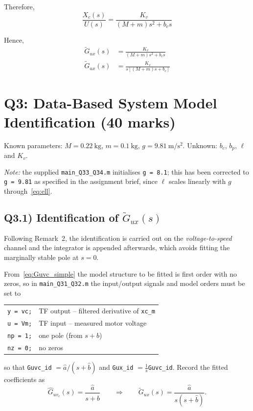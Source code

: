 \documentclass[11pt,a4paper]{article}
\renewcommand{\l}{\ell}
\begin{document}
Therefore,
\begin{equation*}
    \frac{X_{c}(s)}{U(s)} = \frac{K_{v}}{\left( M + m \right)s^{2}+b_{c}s}
\end{equation*}

Hence,
\begin{align}
    \tilde{G}_{ux}(s) &= \frac{K_{v}}{\left( M + m \right) s^{2} 
	+ b_{c} s} \tag{7a} \\
    \tilde{G}_{ux}(s) &= \frac{K_{v}}{s \left[ \left( M + m \right) s 
	+ b_{c} \right]} \tag{7b}
\end{align}

\section*{Q3: Data-Based System Model Identification \hfill (40 marks)}

Known parameters: $M = 0.22~\mathrm{kg}$, $m = 0.1~\mathrm{kg}$,
$g = 9.81~\mathrm{m/s^2}$. Unknown: $b_c$, $b_p$, $\l$ and $K_v$.

\textit{Note:} the supplied \texttt{main\_Q33\_Q34.m} initialises
\texttt{g = 8.1}; this has been corrected to \texttt{g = 9.81} as specified
in the assignment brief, since $\l$ scales linearly with $g$
through~\eqref{eq:ell}.

\subsection*{Q3.1) Identification of $\tilde G_{ux}(s)$}

Following Remark~2, the identification is carried out on the
\emph{voltage-to-speed} channel and the integrator is appended afterwards,
which avoids fitting the marginally stable pole at $s=0$.

From~\eqref{eq:Guvc_simple} the model structure to be fitted is first
order with no zeros, so in \texttt{main\_Q31\_Q32.m} the input/output
signals and model orders must be set to
\begin{center}
\begin{tabular}{@{}ll@{}}
\toprule
\texttt{y  = vc;}   & TF output -- filtered derivative of \texttt{xc\_m} \\
\texttt{u  = Vm;}   & TF input  -- measured motor voltage \\
\texttt{np = 1;}    & one pole (from $s+b$) \\
\texttt{nz = 0;}    & no zeros \\
\bottomrule
\end{tabular}
\end{center}
so that \texttt{Guvc\_id} $=\hat a/(s+\hat b)$ and
\texttt{Gux\_id} $=\tfrac1s$\texttt{Guvc\_id}. Record the fitted
coefficients as
\begin{equation}
\hat G_{uv_c}(s) = \frac{\hat a}{s+\hat b}
\qquad\Longrightarrow\qquad
\tilde G_{ux}(s) = \frac{\hat a}{s(s+\hat b)} .
\label{eq:id_uvc}
\end{equation}
\end{document}
